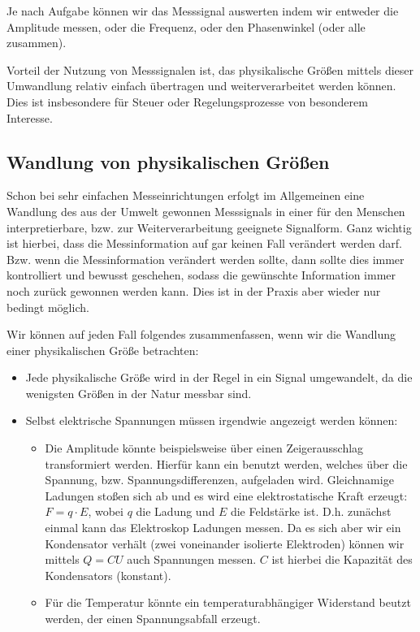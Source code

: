 \documentclass[letterpaper,10pt,english]{jupyterBook}
\begin{document}
\sphinxAtStartPar
Je nach Aufgabe können wir das Messsignal auswerten indem wir entweder die Amplitude messen, oder die Frequenz, oder den Phasenwinkel (oder alle zusammen).

\sphinxAtStartPar
Vorteil der Nutzung von Messsignalen ist, das physikalische Größen mittels dieser Umwandlung relativ einfach übertragen und weiterverarbeitet werden können. Dies ist insbesondere für Steuer\sphinxhyphen{} oder Regelungsprozesse von besonderem Interesse.


\subsection{Wandlung von physikalischen Größen }
\label{\detokenize{content/3_basics:wandlung-von-physikalischen-groszen-a-id-subsec-wandlung-von-physikalischen-groszen-a}}
\sphinxAtStartPar
Schon bei sehr einfachen Messeinrichtungen erfolgt im Allgemeinen eine Wandlung des aus der Umwelt gewonnen Messsignals in einer für den Menschen interpretierbare, bzw. zur Weiterverarbeitung geeignete Signalform. Ganz wichtig ist hierbei, dass die Messinformation auf gar keinen Fall verändert werden darf. Bzw. wenn die Messinformation verändert werden sollte, dann sollte dies immer kontrolliert und bewusst geschehen, sodass die gewünschte Information immer noch zurück gewonnen werden kann. Dies ist in der Praxis aber wieder nur bedingt möglich.

\sphinxAtStartPar
Wir können auf jeden Fall folgendes zusammenfassen, wenn wir die Wandlung einer physikalischen Größe betrachten:
\begin{itemize}
\item {} 
\sphinxAtStartPar
Jede physikalische Größe wird in der Regel in ein Signal umgewandelt, da die wenigsten Größen in der Natur  messbar sind.

\item {} 
\sphinxAtStartPar
Selbst elektrische Spannungen müssen irgendwie angezeigt werden können:
\begin{itemize}
\item {} 
\sphinxAtStartPar
Die Amplitude könnte beispielsweise über einen Zeigerausschlag transformiert werden. Hierfür kann ein  benutzt werden, welches über die Spannung, bzw. Spannungsdifferenzen, aufgeladen wird. Gleichnamige Ladungen stoßen sich ab und es wird eine elektrostatische Kraft erzeugt: \(F = q\cdot E\), wobei \(q\) die Ladung und \(E\) die Feldstärke ist. D.h. zunächst einmal kann das Elektroskop Ladungen messen. Da es sich aber wir ein Kondensator verhält (zwei voneinander isolierte Elektroden) können wir mittels \(Q = CU\) auch Spannungen messen. \(C\) ist hierbei die Kapazität des Kondensators (konstant).

\item {} 
\sphinxAtStartPar
Für die Temperatur könnte ein temperaturabhängiger Widerstand beutzt werden, der einen Spannungsabfall erzeugt.

\end{itemize}

\end{itemize}
\end{document}
